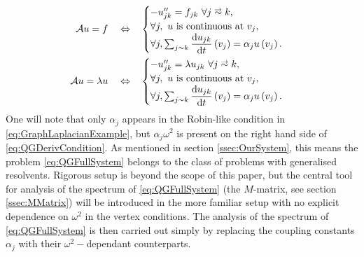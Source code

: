 \begin{align*}
	\mathcal{A}u = f \quad\Leftrightarrow\quad &
	\begin{cases}
		-u_{jk}'' = f_{jk} \ \forall j\conLeft k, \\
		\forall j, \ u \text{ is continuous at } v_j, \\
		\forall j, \sum_{j\con k}\diff{u_{jk}}{t}\bracs{v_j} = \alpha_j u\bracs{v_j}.
	\end{cases} \\
	\mathcal{A}u = \lambda u \quad\Leftrightarrow\quad &
	\begin{cases}
		-u_{jk}'' = \lambda u_{jk} \ \forall j\conLeft k, \\
		\forall j, \ u \text{ is continuous at } v_j, \\
		\forall j, \sum_{j\con k}\diff{u_{jk}}{t}\bracs{v_j} = \alpha_j u\bracs{v_j}.
	\end{cases}
\end{align*}
One will note that only $\alpha_j$ appears in the Robin-like condition in \eqref{eq:GraphLaplacianExample}, but $\alpha_j\omega^2$ is present on the right hand side of \eqref{eq:QGDerivCondition}.
As mentioned in section \ref{ssec:OurSystem}, this means the problem \eqref{eq:QGFullSystem} belongs to the class of problems with generalised resolvents.
Rigorous setup is beyond the scope of this paper, but the central tool for analysis of the spectrum of \eqref{eq:QGFullSystem} (the $M$-matrix, see section \ref{ssec:MMatrix}) will be introduced in the more familiar setup with no explicit dependence on $\omega^2$ in the vertex conditions.
The analysis of the spectrum of \eqref{eq:QGFullSystem} is then carried out simply by replacing the coupling constants $\alpha_j$ with their $\omega^2-$dependant counterparts.

